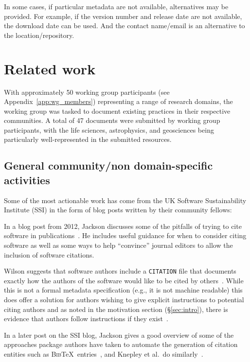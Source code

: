 \documentclass[12pt, oneside]{amsart}
\begin{document}
In some cases, if particular metadata are not available, alternatives may be provided.
For example, if the version number and release date are not available, the download date can be used.
And the contact name\slash email is an alternative to the location\slash repository.


\section{Related work}
\label{sec:related_work}

With approximately 50 working group participants (see Appendix~\ref{app:wg_members})
representing a range of research domains, the working group was tasked to
document existing practices in their respective communities. A total of 47
documents were submitted by working group participants, with the life sciences,
astrophysics, and geosciences being particularly well-represented in the
submitted resources.

\subsection{General community/non domain-specific activities}

Some of the most actionable work has come from the UK Software Sustainability
Institute (SSI) in the form of blog posts written by their community fellows:

In a blog post from 2012, Jackson discusses some of the pitfalls of trying to
cite software in publications~\cite{ssi-how-to-cite}. He includes useful
guidance for when to consider citing software as well as some ways to help
``convince'' journal editors to allow the inclusion of software citations.

Wilson suggests that software authors include a \texttt{CITATION} file that
documents exactly how the authors of the software would like to be cited by
others~\cite{ssi-citation-files}. While this is not a formal metadata
specification (e.g., it is not machine readable) this does offer a solution for
authors wishing to give explicit instructions to potential citing authors and as
noted in the motivation section (\S\ref{sec:intro}), there is evidence that
authors follow instructions if they exist~\cite{10.1371/journal.pone.0136631}.

In a later post on the SSI blog, Jackson gives a good overview of some of the
approaches package authors have taken to automate the generation of citation
entities such as \textsc{Bib}\TeX\ entries~\cite{ssi-how-shalt-i-cite-thee}, and
Knepley et al.\ do similarly~\cite{knepley2013accurately}.
\end{document}
